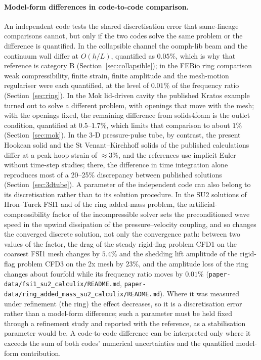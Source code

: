 \paragraph{Model-form differences in code-to-code comparison.}
An independent code tests the shared discretisation error that same-lineage comparisons cannot, but only if the two codes solve the same problem or the difference is quantified.
In the collapsible channel the oomph-lib beam and the continuum wall differ at $O(h/L)$, quantified as $0.05\%$, which is why that reference is category B (Section~\ref{sec:collapsible}); in the FEBio ring comparison weak compressibility, finite strain, finite amplitude and the mesh-motion regulariser were each quantified, at the level of $0.01\%$ of the frequency ratio (Section~\ref{sec:ring}).
In the Mok lid-driven cavity the published Kratos example turned out to solve a different problem, with openings that move with the mesh; with the openings fixed, the remaining difference from solids4foam is the outlet condition, quantified at $0.5$--$1.7\%$, which limits that comparison to about $1\%$ (Section~\ref{sec:mok}).
In the 3-D pressure-pulse tube, by contrast, the present Hookean solid and the St Venant--Kirchhoff solids of the published calculations differ at a peak hoop strain of $\approx3\%$, and the references use implicit Euler without time-step studies; there, the difference in time integration alone reproduces most of a 20--25\% discrepancy between published solutions (Section~\ref{sec:3dtube}).
A parameter of the independent code can also belong to its discretisation rather than to its solution procedure.
In the SU2 solutions of Hron--Turek FSI1 and of the ring added-mass problem, the artificial-compressibility factor of the incompressible solver sets the preconditioned wave speed in the upwind dissipation of the pressure--velocity coupling, and so changes the converged discrete solution, not only the convergence path: between two values of the factor, the drag of the steady rigid-flag problem CFD1 on the coarsest FSI1 mesh changes by $5.4\%$ and the shedding lift amplitude of the rigid-flag problem CFD3 on the 2x mesh by $23\%$, and the amplitude loss of the ring changes about fourfold while its frequency ratio moves by $0.01\%$ (\texttt{paper-data/fsi1\_su2\_calculix/README.md}, \texttt{paper-data/ring\_added\_mass\_su2\_calculix/README.md}).
Where it was measured under refinement (the ring) the effect decreases, so it is a discretisation error rather than a model-form difference; such a parameter must be held fixed through a refinement study and reported with the reference, as a stabilisation parameter would be.
A code-to-code difference can be interpreted only where it exceeds the sum of both codes' numerical uncertainties and the quantified model-form contribution.

